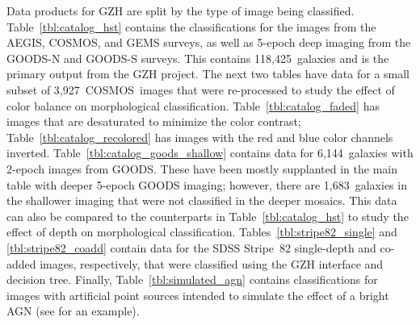 \documentclass[twocolumn]{aastex6}
\begin{document}
Data products for GZH are split by the type of image being classified.
Table~\ref{tbl:catalog_hst} contains the classifications for the \hst{} images
from the AEGIS, COSMOS, and GEMS surveys, as well as 5-epoch deep imaging from
the GOODS-N and GOODS-S surveys. This contains 118,425~galaxies and is the
primary output from the GZH project. The next two tables have data for a small
subset of 3,927~COSMOS~images that were re-processed to study the effect of
color balance on morphological classification. Table~\ref{tbl:catalog_faded}
has images that are desaturated to minimize the color contrast;
Table~\ref{tbl:catalog_recolored} has images with the red and blue color
channels inverted. Table~\ref{tbl:catalog_goods_shallow} contains data for
6,144~galaxies with 2-epoch images from GOODS. These have been mostly
supplanted in the main table with deeper 5-epoch GOODS imaging; however, there
are 1,683~galaxies in the shallower imaging that were not classified in the
deeper mosaics. This data can also be compared to the counterparts in
Table~\ref{tbl:catalog_hst} to study the effect of depth on morphological
classification. Tables~\ref{tbl:stripe82_single} and \ref{tbl:stripe82_coadd}
contain data for the SDSS Stripe~82 single-depth and co-added images,
respectively, that were classified using the GZH interface and decision tree.
Finally, Table~\ref{tbl:simulated_agn} contains classifications for images with
artificial point sources intended to simulate the effect of a bright AGN (see
\citealt{sim14} for an example).
\end{document}
